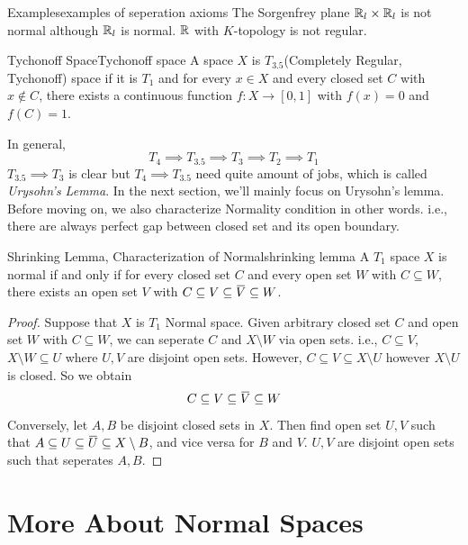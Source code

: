 \documentclass[12pt, a4paper, twoside]{article}
\newcommand{\overbar}[1]{\mkern 1.5mu\overline{\mkern-1.5mu#1\mkern-1.5mu}\mkern 1.5mu}
\theoremstyle{plain}
\begin{document}
\begin{exmp}{Examples}{examples of seperation axioms}
    The Sorgenfrey plane ${\mathbb {R}}_l \times {\mathbb {R}}_l$ is not normal although ${\mathbb {R}}_l$ is normal. 
    ${\mathbb {R}}$ with $K$-topology is not regular. 
\end{exmp}

\begin{defn}{Tychonoff Space}{Tychonoff space}
    A space $X$ is $T_{3.5}$(Completely Regular, Tychonoff) space if it is $T_1$ 
    and for every $x \in X$ and every closed set $C$ with $x \notin C$, 
    there exists a continuous function $f: X \rightarrow [0,1]$ with $f(x) = 0$ and $f(C) = 1$. 
\end{defn}

In general, 
\[T_4 \implies T_{3.5} \implies T_3 \implies T_2 \implies T_1\]
$T_{3.5} \implies T_3$ is clear but $T_4 \implies T_{3.5}$ need quite amount of jobs, which is called \textit{Urysohn's Lemma}. 
In the next section, we'll mainly focus on Urysohn's lemma. Before moving on, 
we also characterize Normality condition in other words. 
i.e., there are always perfect gap between closed set and its open boundary. 

\begin{lem}{Shrinking Lemma, Characterization of Normal}{shrinking lemma}
    A $T_1$ space $X$ is normal if and only if for every closed set 
    $C$ and every open set $W$ with $C \subseteq W$, there exists an open set $V$ with 
    $C \subseteq V \subseteq \overbar{V} \subseteq W$. 
\end{lem}

\begin{proof}
    Suppose that $X$ is $T_1$ Normal space. 
    Given arbitrary closed set $C$ and open set $W$ with $C \subseteq W$, 
    we can seperate $C$ and $X \setminus W$ via open sets. i.e., 
    $C \subseteq V$, $X \setminus W \subseteq U$ where $U, V$ are disjoint open sets. 
    However, $C \subseteq V \subseteq X \setminus U$ however $X \setminus U$ is closed. So we obtain 
    \[C \subseteq V \subseteq \overbar{V} \subseteq W\]
    Conversely, let $A, B$ be disjoint closed sets in $X$. Then find open set $U, V$ such that 
    $A \subseteq U \subseteq \overbar{U} \subseteq X \setminus B$, and vice versa for $B$ and $V$. 
    $U, V$ are disjoint open sets such that seperates $A, B$. 
\end{proof}

\newpage 

\section{More About Normal Spaces}
\end{document}
